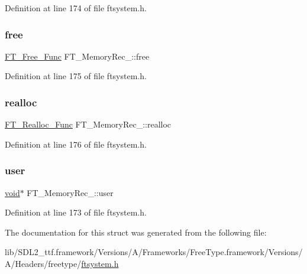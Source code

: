 Definition at line 174 of file ftsystem.\+h.

\mbox{\label{struct_f_t___memory_rec___a83ab2422bd9265d8731b9e5e368ba240}} 
\subsubsection{\texorpdfstring{free}{free}}
{\footnotesize\ttfamily \mbox{\hyperlink{ftsystem_8h_abbf66b34e6c3a7f9564cbe3d6fa6c6fb}{F\+T\+\_\+\+Free\+\_\+\+Func}} F\+T\+\_\+\+Memory\+Rec\+\_\+\+::free}



Definition at line 175 of file ftsystem.\+h.

\mbox{\label{struct_f_t___memory_rec___a5ce3424cc72e898fe973ffeabe44a95c}} 
\subsubsection{\texorpdfstring{realloc}{realloc}}
{\footnotesize\ttfamily \mbox{\hyperlink{ftsystem_8h_a264ca9013613b2454d64987bf768ac93}{F\+T\+\_\+\+Realloc\+\_\+\+Func}} F\+T\+\_\+\+Memory\+Rec\+\_\+\+::realloc}



Definition at line 176 of file ftsystem.\+h.

\mbox{\label{struct_f_t___memory_rec___aae5bc614434ba4525e37d7faaf03c4b7}} 
\subsubsection{\texorpdfstring{user}{user}}
{\footnotesize\ttfamily \mbox{\hyperlink{_s_d_l__opengles2__gl2ext_8h_ae5d8fa23ad07c48bb609509eae494c95}{void}}$\ast$ F\+T\+\_\+\+Memory\+Rec\+\_\+\+::user}



Definition at line 173 of file ftsystem.\+h.



The documentation for this struct was generated from the following file\+:\begin{DoxyCompactItemize}
\item 
lib/\+S\+D\+L2\+\_\+ttf.\+framework/\+Versions/\+A/\+Frameworks/\+Free\+Type.\+framework/\+Versions/\+A/\+Headers/freetype/\mbox{\hyperlink{ftsystem_8h}{ftsystem.\+h}}\end{DoxyCompactItemize}
